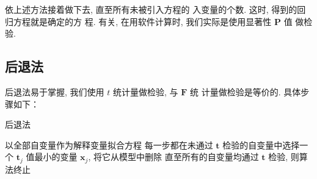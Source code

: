 依上述方法接着做下去, 直至所有未被引入方程的
入变量的个数. 这时, 得到的回归方程就是确定的方
程. 
有关, 在用软件计算时, 我们实际是使用显著性 \( \boldsymbol{P} \) 值
做检验. 

\subsection{后退法}

后退法易于掌握, 我们使用 \( t \) 统计量做检验, 与 \( \boldsymbol{F} \) 统
计量做检验是等价的. 具体步骤如下：

\begin{algorithm}
    \caption{后退法}
    以全部自变量作为解释变量拟合方程\;
    每一步都在未通过 \( \boldsymbol{t} \) 检验的自变量中选择一个
\( \boldsymbol{t}_{j} \) 值最小的变量 \( \boldsymbol{x}_{j} \), 将它从模型中删除\;
    直至所有的自变量均通过 \( \boldsymbol{t} \) 检验, 则算法终止\;
\end{algorithm}
